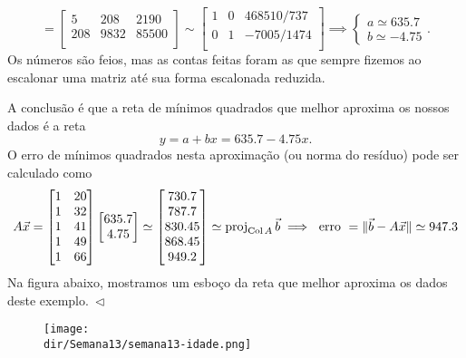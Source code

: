 \documentclass[../livro.tex]{subfiles}  %
\providecommand{\dir}{..}
\begin{document}
\begin{example}
  \begin{equation}
  [\, A^TA \ | \ \vec{b} \, ] =
  \begin{bmatrix}
    5    & 208 & 2190 \\
    208  & 9832 & 85500 \\
  \end{bmatrix} \sim
  \begin{bmatrix}
    1 & 0 & 468510/737 \\
    0 & 1 & -7005/1474 \\
  \end{bmatrix} \implies
  \left\{
    \begin{array}{ll}
      a \simeq 635.7 \\
      b \simeq -4.75
    \end{array}
  \right..
  \end{equation} Os números são feios, mas as contas feitas foram as que sempre fizemos ao escalonar uma matriz até sua forma escalonada reduzida.

  A conclusão é que a reta de mínimos quadrados que melhor aproxima os nossos dados é a reta
  \begin{equation}
  y = a + b x = 635.7 - 4.75 x.
  \end{equation} O erro de mínimos quadrados nesta aproximação (ou norma do resíduo) pode ser calculado como
  \begin{equation}
  A \vec{x} = \begin{bmatrix}
    1 & 20 \\
    1 & 32 \\
    1 & 41 \\
    1 & 49 \\
    1 & 66 \\
  \end{bmatrix}
  \begin{bmatrix}
    635.7 \\
    4.75 \\
  \end{bmatrix} \simeq
  \begin{bmatrix}
    730.7 \\
    787.7 \\
    830.45 \\
    868.45 \\
    949.2 \\
  \end{bmatrix} \simeq \operatorname{proj}_{\operatorname{Col} A} \vec{b} \implies \text{ erro } = \| \vec{b} - A\vec{x} \| \simeq 947.3
  \end{equation} Na figura abaixo, mostramos um esboço da reta que melhor aproxima os dados deste exemplo$. \ \lhd$
  \begin{figure}[h!]
    \begin{center}
      \texttt{[image: \\dir/Semana13/semana13-idade.png]}
    \end{center}
  \end{figure}
\end{example}
\end{document}
